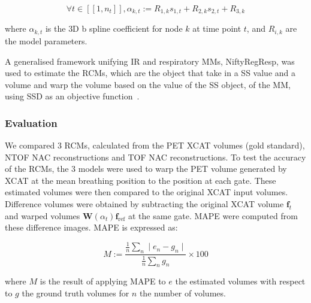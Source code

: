                 \begin{equation}  \label{eq:b_spline_coefficients}
                    \forall t \in [[1,n_t]], \alpha_{k,t} := R_{1,k} s_{1,t} + R_{2,k} s_{2,t} + R_{3,k}
                \end{equation}
                
                \noindent where $\alpha_{k,t}$ is the \gls{3D} b spline coefficient for node $k$ at time point $t$, and $R_{i,k}$ are the model parameters.
            
                A generalised framework unifying \gls{IR} and respiratory \gls{MM}s, NiftyRegResp, was used to estimate the \gls{RCM}s, which are the object that take in a \gls{SS} value and a volume and warp the volume based on the value of the \gls{SS} object, of the \gls{MM}, using \gls{SSD} as an objective function~.
                
            \subsubsection{Evaluation} \label{impact_of_tof_on_respiratory_motion_modelling_using_nac_pet_methods_evaluation}
                We compared $3$ \gls{RCM}s, calculated from the \gls{PET} \gls{XCAT} volumes (gold standard), \gls{NTOF} \gls{NAC} reconstructions and \gls{TOF} \gls{NAC} reconstructions. To test the accuracy of the \gls{RCM}s, the $3$ models were used to warp the \gls{PET} volume generated by \gls{XCAT} at the mean breathing position to the position at each gate. These estimated volumes were then compared to the original \gls{XCAT} input volumes. Difference volumes were obtained by subtracting the original \gls{XCAT} volume $\mathbf{f}_t$ and warped volumes $\mathbf{W}(\alpha_t) \mathbf{f}_\mathrm{ref}$ at the same gate. \gls{MAPE} were computed from these difference images. \gls{MAPE} is expressed as:
                
                \begin{equation}  \label{eq:mape}
                   M := \frac{\frac{1}{n}\sum_{n}\mid e_n - g_n \mid}{\frac{1}{n}\sum_{n}g_n} \times 100
                \end{equation}
                
                \noindent where $M$ is the result of applying \gls{MAPE} to $e$ the estimated volumes with respect to $g$ the ground truth volumes for $n$ the number of volumes.
                
